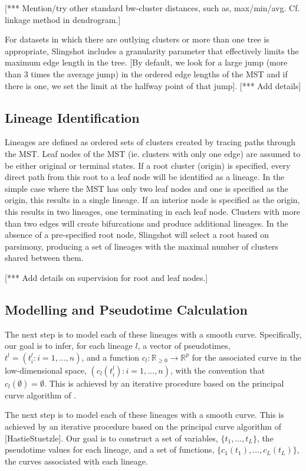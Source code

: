 \documentclass[11pt]{article}\usepackage[]{graphicx}\usepackage[]{color}
\begin{document}
[*** Mention/try other standard bw-cluster distances, such as, max/min/avg. Cf. linkage method in dendrogram.]

For datasets in which there are outlying clusters or more than one tree is appropriate, Slingshot includes a granularity parameter that effectively limits the maximum edge length in the tree. [By default, we look for a large jump (more than 3 times the average jump) in the ordered edge lengths of the MST and if there is one, we set the limit at the halfway point of that jump]. [*** Add details]


\subsection{Lineage Identification}
\label{s:lineage}
Lineages are defined as ordered sets of clusters created by tracing paths through the MST. Leaf nodes of the MST (ie. clusters with only one edge) are assumed to be either original or terminal states. If a root cluster (origin) is specified, every direct path from this root to a leaf node will be identified as a lineage. In the simple case where the MST has only two leaf nodes and one is specified as the origin, this results in a single lineage. If an interior node is specified as the origin, this results in two lineages, one terminating in each leaf node. Clusters with more than two edges will create bifurcations and produce additional lineages. In the absence of a pre-specified root node, Slingshot will select a root based on parsimony, producing a set of lineages with the maximal number of clusters shared between them.

[*** Add details on supervision for root and leaf nodes.]


\subsection{Modelling and Pseudotime Calculation}
\label{s:pseudotime}
The next step is to model each of these lineages with a smooth curve. Specifically, our goal is to infer, for each lineage $l$, a vector of pseudotimes, $t^l = (t^l_i: i=1,\ldots,n)$, and a function $c_l: \mathbb{R}_{\geq 0} \rightarrow \mathbb{R}^p$ for the associated curve in the low-dimensional space, $(c_l(t^l_i): i=1,\ldots,n)$, with the convention that $c_l(\emptyset) = \emptyset$. This is achieved by an iterative procedure based on the principal curve algorithm of \citet{Hastie&Stuetzle89}.


The next step is to model each of these lineages with a smooth curve. This is achieved by an iterative procedure based on the principal curve algorithm of [HastieStuetzle]. Our goal is to construct a set of variables, $\{t_1,...,t_L\}$, the pseudotime values for each lineage, and a set of functions, $\{c_1(t_1),...,c_L(t_L)\}$, the curves associated with each lineage.
\end{document}
